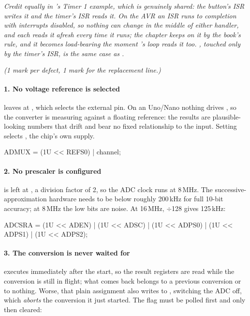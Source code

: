 \textit{Credit equally  in 's Timer 1 example, which is genuinely
shared: the button's ISR writes it and the timer's ISR reads it. On the AVR an ISR runs to
completion with interrupts disabled, so nothing can change  in the middle of either
handler, and each reads it afresh every time it runs; the chapter keeps  on it by the
book's rule, and it becomes load-bearing the moment 's loop reads it too.
, touched only by the timer's ISR, is the same case as .}


\textit{(1 mark per defect, 1 mark for the replacement line.)}

\paragraph{1. No voltage reference is selected}
 leaves  at , which selects the external
 pin. On an Uno/Nano nothing drives , so the converter is measuring against a
floating reference: the results are plausible-looking numbers that drift and bear no fixed
relationship to the input. Setting  selects , the chip's own supply.

\begin{ccode}
ADMUX = (1U << REFS0) | channel;
\end{ccode}

\paragraph{2. No prescaler is configured}
 is left at , a division factor of 2, so the ADC clock runs at 8\,MHz. The
successive-approximation hardware needs to be below roughly 200\,kHz for full 10-bit accuracy; at
8\,MHz the low bits are noise. At 16\,MHz, $\div$128 gives 125\,kHz:

\begin{ccode}
ADCSRA = (1U << ADEN) | (1U << ADSC) | (1U << ADPS0) | (1U << ADPS1) | (1U << ADPS2);
\end{ccode}

\paragraph{3. The conversion is never waited for}
 executes immediately after the start, so the result registers are
read while the conversion is still in flight; what comes back belongs to a previous conversion or
to nothing. Worse, that plain assignment also writes  to , switching the ADC off,
which \emph{aborts} the conversion it just started. The flag must be polled first and only then
cleared:

